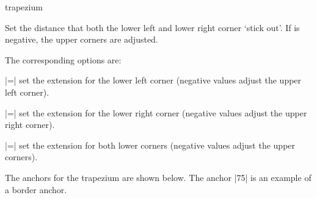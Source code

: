 \begin{shape}{trapezium}
   \begin{command}{\pgftrapeziumextension{}}
    Set the distance that both the lower left and lower right corner 
    `stick out'. If  is negative, the upper corners are
    adjusted.
   \end{command}
   
   The corresponding \tikzname{} options are:

  \begin{itemize}
    |=|
    set the extension for the lower left corner (negative values adjust
    the upper left corner).
    
    |=|
    set the extension for the lower right corner (negative values adjust
    the upper right corner).
    
    |=|
    set the extension for both lower corners (negative values adjust
    the upper corners).
    
  \end{itemize}
  
 	The anchors for the trapezium are shown below. The anchor |75| is an
	example of a border anchor.

\begin{codeexample}[]
\Huge
{}
\end{codeexample}
   
\end{shape}


